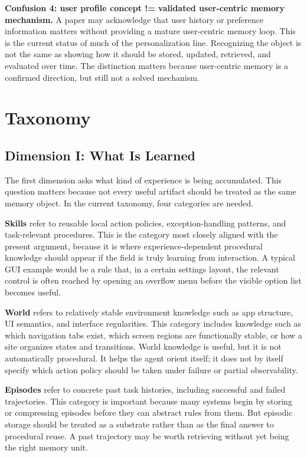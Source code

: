 \documentclass{article}
\begin{document}
\textbf{Confusion 4: user profile concept != validated user-centric
memory mechanism.} A paper may acknowledge that user history or
preference information matters without providing a mature user-centric
memory loop. This is the current status of much of the personalization
line. Recognizing the object is not the same as showing how it should be
stored, updated, retrieved, and evaluated over time. The distinction
matters because user-centric memory is a confirmed direction, but still
not a solved mechanism.

\section{Taxonomy}\label{4-taxonomy}

\subsection{Dimension I: What Is Learned}\label{41-dimension-i-what-is-learned}

The first dimension asks what kind of experience is being accumulated.
This question matters because not every useful artifact should be
treated as the same memory object. In the current taxonomy, four
categories are needed.

\textbf{Skills} refer to reusable local action policies,
exception-handling patterns, and task-relevant procedures. This is the
category most closely aligned with the present argument, because it is
where experience-dependent procedural knowledge should appear if the
field is truly learning from interaction. A typical GUI example would be
a rule that, in a certain settings layout, the relevant control is often
reached by opening an overflow menu before the visible option list
becomes useful.

\textbf{World} refers to relatively stable environment knowledge such as
app structure, UI semantics, and interface regularities. This category
includes knowledge such as which navigation tabs exist, which screen
regions are functionally stable, or how a site organizes states and
transitions. World knowledge is useful, but it is not automatically
procedural. It helps the agent orient itself; it does not by itself
specify which action policy should be taken under failure or partial
observability.

\textbf{Episodes} refer to concrete past task histories, including
successful and failed trajectories. This category is important because
many systems begin by storing or compressing episodes before they can
abstract rules from them. But episodic storage should be treated as a
substrate rather than as the final answer to procedural reuse. A past
trajectory may be worth retrieving without yet being the right memory
unit.
\end{document}
